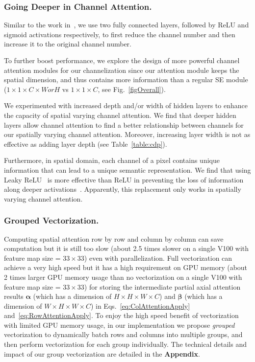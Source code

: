 \documentclass[letterpaper]{article} \usepackage{aaai22}  \usepackage{times}  \usepackage{helvet}  \usepackage{courier}  \usepackage[hyphens]{url}  \usepackage{graphicx} \urlstyle{rm} \def\UrlFont{\rm}  \usepackage{natbib}  \usepackage{caption} \DeclareCaptionStyle{ruled}{labelfont=normalfont,labelsep=colon,strut=off} \frenchspacing  \setlength{\pdfpagewidth}{8.5in}  \setlength{\pdfpageheight}{11in}  \usepackage{algorithm}
\begin{document}
\subsubsection{Going Deeper in Channel Attention.}
\label{sGoingDeeper}

Similar to the work in~\cite{cSENet}, we use two fully connected layers, followed by ReLU and sigmoid activations respectively, to first reduce the channel number and then increase it to the original channel number.

To further boost performance, we explore the design of more powerful channel attention modules for our channelization since our attention module keeps the spatial dimension, and thus contains more information than a regular SE module ($1\times 1\times C\times W or H$ vs $1\times 1\times C $, see Fig.~\ref{figOverall}).

We experimented with increased depth and/or width of hidden layers to enhance the capacity of spatial varying channel attention. 
We find that deeper hidden layers allow channel attention to find a better relationship between channels for our spatially varying channel attention.
Moreover, increasing layer width is not as effective as adding layer depth (see Table~\ref{table:cdp}).

Furthermore, in spatial domain, each channel of a pixel contains unique information that can lead to a unique semantic representation. 
We find that using Leaky ReLU~\cite{cLeakyrelu} is more effective than ReLU in preventing the loss of information along deeper activations~\cite{cMobileNetV2}. 
Apparently, this replacement only works in spatially varying channel attention.

\subsubsection{Grouped Vectorization.} \label {sec:secGroupVect}

Computing spatial attention row by row and column by column can save computation but it is still too slow (about 2.5 times slower on a single V100 with feature map size = $33\times33$) even with parallelization. 
Full vectorization can achieve a very high speed but it has a high requirement on GPU memory (about 2 times larger GPU memory usage than no vectorization on a single V100 with feature map size = $33\times33$) for storing the intermediate partial axial attention results $\bm{\alpha}$ (which has a dimension of $H \times H \times W \times C$) and $\bm{\beta}$ (which has a dimension of $W\times H \times W \times C$) in Eqs.~\eqref{eq:ColAttentionApply} and~\eqref{eq:RowAttentionApply}. 
To enjoy the high speed benefit of vectorization with limited GPU memory usage, in our implementation we propose \textit{grouped} vectorization to dynamically batch rows and columns into multiple groups, and then perform vectorization for each group individually. 
The technical details and impact of our group vectorization are detailed in the \textbf{Appendix}.
\end{document}
